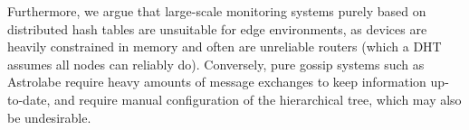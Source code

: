 Furthermore, we argue that large-scale monitoring systems purely based on distributed hash tables \cite{SDIMS} are unsuitable for edge environments, as  devices are heavily constrained in memory and often are unreliable routers (which a DHT assumes all nodes can reliably do). Conversely, pure gossip systems such as Astrolabe \cite{Renesse2003} require heavy amounts of message exchanges to keep information up-to-date, and require manual configuration of the hierarchical tree, which may also be undesirable. 





    
    
